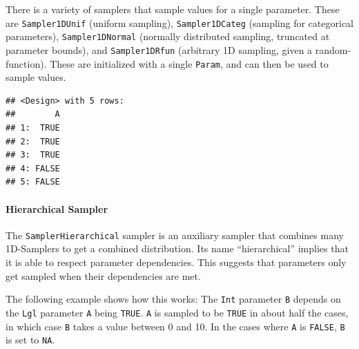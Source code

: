 \documentclass[
]{scrbook}
\newenvironment{Shaded}{\begin{snugshade}}{\end{snugshade}}
\newcommand{\DecValTok}[1]{\textcolor[rgb]{0.00,0.00,0.81}{#1}}
\newcommand{\FunctionTok}[1]{\textcolor[rgb]{0.00,0.00,0.00}{#1}}
\newcommand{\NormalTok}[1]{#1}
\newcommand{\OtherTok}[1]{\textcolor[rgb]{0.56,0.35,0.01}{#1}}
\newcommand{\SpecialCharTok}[1]{\textcolor[rgb]{0.00,0.00,0.00}{#1}}
\renewenvironment{Shaded} {\begin{snugshade}\small} {\end{snugshade}}
\begin{document}
There is a variety of samplers that sample values for a single parameter.
These are \texttt{Sampler1DUnif} (uniform sampling), \texttt{Sampler1DCateg} (sampling for categorical parameters), \texttt{Sampler1DNormal} (normally distributed sampling, truncated at parameter bounds), and \texttt{Sampler1DRfun} (arbitrary 1D sampling, given a random-function).
These are initialized with a single \texttt{Param}, and can then be used to sample values.

\begin{Shaded}
\end{Shaded}

\begin{verbatim}
## <Design> with 5 rows:
##        A
## 1:  TRUE
## 2:  TRUE
## 3:  TRUE
## 4: FALSE
## 5: FALSE
\end{verbatim}

\hypertarget{hierarchical-sampler}{%
\paragraph{Hierarchical Sampler}\label{hierarchical-sampler}}

The \texttt{SamplerHierarchical} sampler is an auxiliary sampler that combines many 1D-Samplers to get a combined distribution.
Its name ``hierarchical'' implies that it is able to respect parameter dependencies.
This suggests that parameters only get sampled when their dependencies are met.

The following example shows how this works: The \texttt{Int} parameter \texttt{B} depends on the \texttt{Lgl} parameter \texttt{A} being \texttt{TRUE}.
\texttt{A} is sampled to be \texttt{TRUE} in about half the cases, in which case \texttt{B} takes a value between 0 and 10.
In the cases where \texttt{A} is \texttt{FALSE}, \texttt{B} is set to \texttt{NA}.
\end{document}
